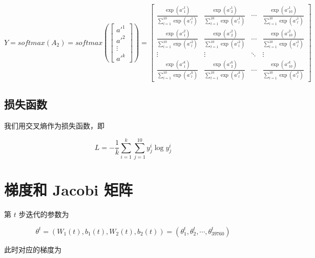 \documentclass[12pt,a4paper]{amsart}
\begin{document}
\begin{equation} \label{eq:6}
	Y = softmax(A_2) = softmax(\begin{bmatrix}
		{a'}^1 \\
		{a'}^2 \\
		\vdots  \\
		{a'}^k
		\end{bmatrix}) = \begin{bmatrix}
			\frac{\exp({{a'}^1_1})}{\sum_{l=1}^{10} \exp({{a'}^1_l})} & \frac{\exp({{a'}^1_2})}{\sum_{l=1}^{10} \exp({{a'}^1_l})} & \cdots & \frac{\exp({{a'}^1_{10}})}{\sum_{l=1}^{10} \exp({{a'}^1_l})} \\
			\frac{\exp({{a'}^2_1})}{\sum_{l=1}^{10} \exp({{a'}^2_l})} & \frac{\exp({{a'}^2_2})}{\sum_{l=1}^{10} \exp({{a'}^2_l})} & \cdots & \frac{\exp({{a'}^2_{10}})}{\sum_{l=1}^{10} \exp({{a'}^2_l})} \\
			\vdots                                                      & \vdots                                                      & \ddots & \vdots                                                      \\
			\frac{\exp({{a'}^k_1})}{\sum_{l=1}^{10} \exp({{a'}^k_l})} & \frac{\exp({{a'}^k_2})}{\sum_{l=1}^{10} \exp({{a'}^k_l})} & \cdots & \frac{\exp({{a'}^k_{10}})}{\sum_{l=1}^{10} \exp({{a'}^k_l})}
		\end{bmatrix}
\end{equation}

\subsection{损失函数}

我们用交叉熵作为损失函数，即

\begin{equation}
	L = - \frac{1}{k} \sum_{i=1}^{k} \sum_{j=1}^{10} y_j^i \log y_j^i
\end{equation}

\section{梯度和 Jacobi 矩阵}

第 $t$ 步迭代的参数为

\begin{equation}
	\theta^t = (W_1(t), b_1(t), W_2(t), b_2(t)) = (\theta_1^t, \theta_2^t, \cdots, \theta_{39760}^t)
\end{equation}

此时对应的梯度为
\end{document}
